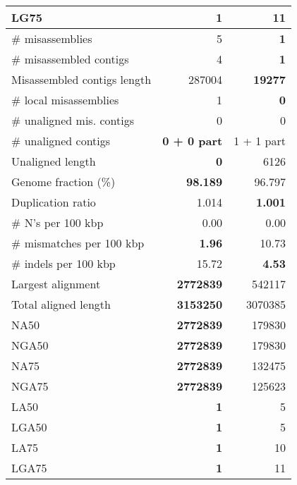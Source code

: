 \documentclass[12pt,a4paper]{article}
\begin{document}
\begin{table}[ht]
\begin{center}
\begin{tabular}{|l*{2}{|r}|}
LG75 & {\bf 1} & 11 \\ \hline
\# misassemblies & 5 & {\bf 1} \\ \hline
\# misassembled contigs & 4 & {\bf 1} \\ \hline
Misassembled contigs length & 287004 & {\bf 19277} \\ \hline
\# local misassemblies & 1 & {\bf 0} \\ \hline
\# unaligned mis. contigs & 0 & 0 \\ \hline
\# unaligned contigs & {\bf 0 + 0 part} & 1 + 1 part \\ \hline
Unaligned length & {\bf 0} & 6126 \\ \hline
Genome fraction (\%) & {\bf 98.189} & 96.797 \\ \hline
Duplication ratio & 1.014 & {\bf 1.001} \\ \hline
\# N's per 100 kbp & 0.00 & 0.00 \\ \hline
\# mismatches per 100 kbp & {\bf 1.96} & 10.73 \\ \hline
\# indels per 100 kbp & 15.72 & {\bf 4.53} \\ \hline
Largest alignment & {\bf 2772839} & 542117 \\ \hline
Total aligned length & {\bf 3153250} & 3070385 \\ \hline
NA50 & {\bf 2772839} & 179830 \\ \hline
NGA50 & {\bf 2772839} & 179830 \\ \hline
NA75 & {\bf 2772839} & 132475 \\ \hline
NGA75 & {\bf 2772839} & 125623 \\ \hline
LA50 & {\bf 1} & 5 \\ \hline
LGA50 & {\bf 1} & 5 \\ \hline
LA75 & {\bf 1} & 10 \\ \hline
LGA75 & {\bf 1} & 11 \\ \hline
\end{tabular}
\end{center}
\end{table}
\end{document}
